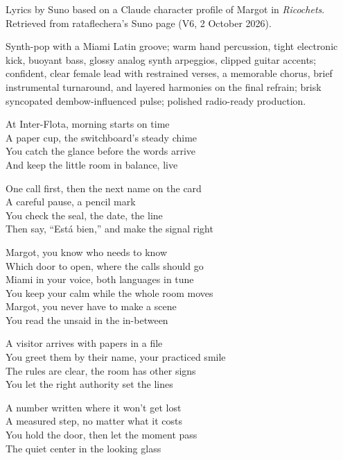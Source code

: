 
\begin{notes}
Lyrics by Suno based on a Claude character profile of Margot in \emph{Ricochets}. Retrieved from rataflechera’s Suno page (V6, 2 October 2026).
\end{notes}
\begin{style}
Synth-pop with a Miami Latin groove; warm hand percussion, tight electronic kick, buoyant bass, glossy analog synth arpeggios, clipped guitar accents; confident, clear female lead with restrained verses, a memorable chorus, brief instrumental turnaround, and layered harmonies on the final refrain; brisk syncopated dembow-influenced pulse; polished radio-ready production.
\end{style}
\begin{lyrics}
At Inter-Flota, morning starts on time\\
A paper cup, the switchboard’s steady chime\\
You catch the glance before the words arrive\\
And keep the little room in balance, live

One call first, then the next name on the card\\
A careful pause, a pencil mark\\
You check the seal, the date, the line\\
Then say, “Está bien,” and make the signal right

Margot, you know who needs to know\\
Which door to open, where the calls should go\\
Miami in your voice, both languages in tune\\
You keep your calm while the whole room moves\\
Margot, you never have to make a scene\\
You read the unsaid in the in-between

A visitor arrives with papers in a file\\
You greet them by their name, your practiced smile\\
The rules are clear, the room has other signs\\
You let the right authority set the lines

A number written where it won’t get lost\\
A measured step, no matter what it costs\\
You hold the door, then let the moment pass\\
The quiet center in the looking glass


\end{lyrics}
